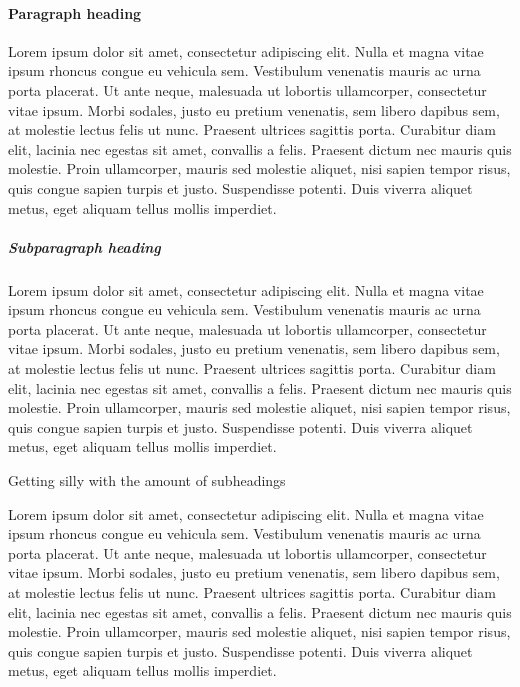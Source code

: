 \documentclass[\pandocDocMode,longtable,noextraspace,floatsintext]{apa6}
\begin{document}
\hypertarget{paragraph-heading}{%
\paragraph{Paragraph heading}\label{paragraph-heading}}

Lorem ipsum dolor sit amet, consectetur adipiscing elit. Nulla et magna
vitae ipsum rhoncus congue eu vehicula sem. Vestibulum venenatis mauris
ac urna porta placerat. Ut ante neque, malesuada ut lobortis
ullamcorper, consectetur vitae ipsum. Morbi sodales, justo eu pretium
venenatis, sem libero dapibus sem, at molestie lectus felis ut nunc.
Praesent ultrices sagittis porta. Curabitur diam elit, lacinia nec
egestas sit amet, convallis a felis. Praesent dictum nec mauris quis
molestie. Proin ullamcorper, mauris sed molestie aliquet, nisi sapien
tempor risus, quis congue sapien turpis et justo. Suspendisse potenti.
Duis viverra aliquet metus, eget aliquam tellus mollis imperdiet.

\hypertarget{subparagraph-heading}{%
\subparagraph{Subparagraph heading}\label{subparagraph-heading}}

Lorem ipsum dolor sit amet, consectetur adipiscing elit. Nulla et magna
vitae ipsum rhoncus congue eu vehicula sem. Vestibulum venenatis mauris
ac urna porta placerat. Ut ante neque, malesuada ut lobortis
ullamcorper, consectetur vitae ipsum. Morbi sodales, justo eu pretium
venenatis, sem libero dapibus sem, at molestie lectus felis ut nunc.
Praesent ultrices sagittis porta. Curabitur diam elit, lacinia nec
egestas sit amet, convallis a felis. Praesent dictum nec mauris quis
molestie. Proin ullamcorper, mauris sed molestie aliquet, nisi sapien
tempor risus, quis congue sapien turpis et justo. Suspendisse potenti.
Duis viverra aliquet metus, eget aliquam tellus mollis imperdiet.

Getting silly with the amount of subheadings

Lorem ipsum dolor sit amet, consectetur adipiscing elit. Nulla et magna
vitae ipsum rhoncus congue eu vehicula sem. Vestibulum venenatis mauris
ac urna porta placerat. Ut ante neque, malesuada ut lobortis
ullamcorper, consectetur vitae ipsum. Morbi sodales, justo eu pretium
venenatis, sem libero dapibus sem, at molestie lectus felis ut nunc.
Praesent ultrices sagittis porta. Curabitur diam elit, lacinia nec
egestas sit amet, convallis a felis. Praesent dictum nec mauris quis
molestie. Proin ullamcorper, mauris sed molestie aliquet, nisi sapien
tempor risus, quis congue sapien turpis et justo. Suspendisse potenti.
Duis viverra aliquet metus, eget aliquam tellus mollis imperdiet.
\end{document}
